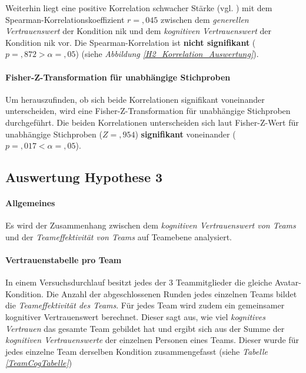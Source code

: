\documentclass[a4paper,11pt]{article}%
\renewcommand{\\}{\vspace*{0.5\baselineskip} \newline}
\begin{document}
{Weiterhin liegt eine positive Korrelation schwacher Stärke (vgl. \citep{cohen2013statistical}) mit dem Spearman-Korrelationskoeffizient $r = ,045$ zwischen dem \textit{generellen Vertrauenswert} der Kondition \newline \ac{nik} und dem \textit{kognitiven Vertrauenswert} der Kondition \ac{nik} vor. Die Spearman-Korrelation ist \textbf{nicht signifikant} ($p = ,872 > \alpha = ,05$) (siehe \textit{Abbildung \ref{H2_Korrelation_Auswertung}}).

\paragraph{Fisher-Z-Transformation für unabhängige Stichproben}
Um herauszufinden, ob sich beide Korrelationen signifikant voneinander unterscheiden, wird eine Fisher-Z-Transformation für unabhängige Stichproben durchgeführt.
Die beiden Korrelationen unterscheiden sich laut Fisher-Z-Wert für unabhängige Stichproben ($Z =,954$) \textbf{signifikant} voneinander ($p =,017 < \alpha =,05$).

\newpage
\clearpage
\subsection{Auswertung Hypothese 3}
\label{Auswertung Hypothese 3}
\paragraph{Allgemeines}
Es wird der Zusammenhang zwischen dem \textit{kognitiven Vertrauenswert von Teams} und der \textit{Teameffektivität von Teams} auf Teamebene analysiert.

\paragraph{Vertrauenstabelle pro Team}
In einem Versuchsdurchlauf besitzt jedes der 3 Teammitglieder die gleiche Avatar-Kondition. Die Anzahl der abgeschlossenen Runden jedes einzelnen Teams bildet die \textit{Teameffektivität des Teams}. 
Für jedes Team wird zudem ein gemeinsamer kognitiver Vertrauenswert berechnet. Dieser sagt aus, wie viel \textit{kognitives Vertrauen} das gesamte Team gebildet hat und ergibt sich aus der Summe der \textit{kognitiven Vertrauenswerte} der einzelnen Personen eines Teams. Dieser wurde für jedes einzelne Team derselben Kondition zusammengefasst (siehe \textit{Tabelle \ref{TeamCogTabelle}})

}
\end{document}
